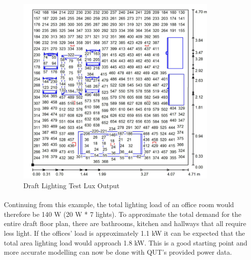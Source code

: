 \begin{figure}[H]
\hfill\includegraphics[width = 100mm]{images/lighting_draft_output}\hspace*{\fill}
\caption{Draft Lighting Test Lux Output} 
\label{fig:DraftLightingLux}
\end{figure} 

\paragraph{}
Continuing from this example, the total lighting load of an office room would therefore be 140 W (20 W * 7 lights). To approximate the total demand for the entire draft floor plan, there are bathrooms, kitchen and hallways that all require less light. If the offices' load is approximately 1.1 kW it can be expected that the total area lighting load would approach 1.8 kW. This is a good starting point and more accurate modelling can now be done with QUT's provided power data. 